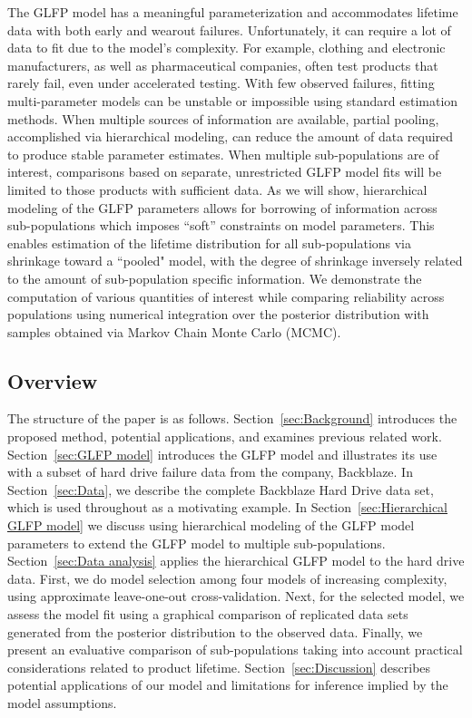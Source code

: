\documentclass[12pt]{article}
\begin{document}
The GLFP model has a meaningful parameterization and accommodates lifetime data with both early and wearout failures.  Unfortunately, it can require a lot of data to fit due to the model's complexity.  For example, clothing and electronic manufacturers, as well as pharmaceutical companies, often test products that rarely fail, even under accelerated testing.  With few observed failures, fitting multi-parameter models can be unstable or impossible using standard estimation methods.  When multiple sources of information are available, partial pooling, accomplished via hierarchical modeling, can reduce the amount of data required to produce stable parameter estimates. When multiple sub-populations are of interest, comparisons based on separate, unrestricted GLFP model fits will be limited to those products with sufficient data. As we will show, hierarchical modeling of the GLFP parameters allows for borrowing of information across sub-populations which imposes ``soft'' constraints on model parameters. This enables estimation of the lifetime distribution for all sub-populations via shrinkage toward a ``pooled" model, with the degree of shrinkage inversely related to the amount of sub-population specific information. We demonstrate the computation of various quantities of interest while comparing reliability across populations using numerical integration over the posterior distribution with samples obtained via Markov Chain Monte Carlo (MCMC).

\subsection{Overview}
The structure of the paper is as follows. Section~\ref{sec:Background} introduces the proposed method, potential applications, and examines previous related work.  Section~\ref{sec:GLFP model} introduces the GLFP model and illustrates its use with a subset of hard drive failure data from the company, Backblaze.  In Section~\ref{sec:Data}, we describe the complete Backblaze Hard Drive data set, which is used throughout as a motivating example. In Section~\ref{sec:Hierarchical GLFP model} we discuss using hierarchical modeling of the GLFP model parameters to extend the GLFP model to multiple sub-populations. Section~\ref{sec:Data analysis} applies the hierarchical GLFP model to the hard drive data. First, we do model selection among four models of increasing complexity, using approximate leave-one-out cross-validation. Next, for the selected model, we assess the model fit using a graphical comparison of replicated data sets generated from the posterior distribution to the observed data. Finally, we present an evaluative comparison of sub-populations taking into account practical considerations related to product lifetime. Section~\ref{sec:Discussion} describes potential applications of our model and limitations for inference implied by the model assumptions.
\end{document}
